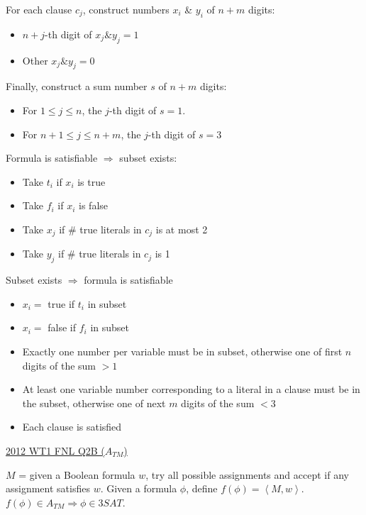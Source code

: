 \documentclass[10pt,landscape,a4paper]{article}
\newcommand{\encoding}[1]{\left \langle #1 \right \rangle}
\begin{document}
\begin{multicols*}{3}
For each clause $c_j$, construct numbers $x_i$ \& $y_i$ of $n + m$ digits:

\begin{itemize}
    \item $n+j$-th digit of $x_j \& y_j = 1$
    \item Other $x_j \& y_j = 0$
\end{itemize}

Finally, construct a sum number $s$ of $n + m$ digits:

\begin{itemize}
    \item For $1 \leq j \leq n$, the $j$-th digit of $s = 1$.
    \item For $n + 1 \leq j \leq n + m$, the $j$-th digit of $s = 3$
\end{itemize}

Formula is satisfiable $\Rightarrow$ subset exists:

\begin{itemize}
    \item Take $t_i$ if $x_i$ is true
    \item Take $f_i$ if $x_i$ is false
    \item Take $x_j$ if \# true literals in $c_j$ is at most 2
    \item Take $y_j$ if \# true literals in $c_j$ is 1
\end{itemize}

Subset exists $\Rightarrow$ formula is satisfiable

\begin{itemize}
    \item $x_i = $ true if $t_i$ in subset
    \item $x_i = $ false if $f_i$ in subset
    \item Exactly one number per variable must be in subset, otherwise one of first $n$ digits of the sum $ > 1$
    \item At least one variable number corresponding to a literal in a clause must be in the subset, otherwise one of next $m$ digits of the sum $< 3$
    \item Each clause is satisfied
\end{itemize}

\underline{2012 WT1 FNL Q2B ($A_{TM}$)}

$M$ = given a Boolean formula $w$, try all possible assignments and accept if any assignment satisfies $w$. Given a formula $\phi$, define $f(\phi) = \encoding{M, w}$. $f(\phi) \in A_{TM} \Rightarrow \phi \in 3SAT$.


\end{multicols*}
\end{document}
